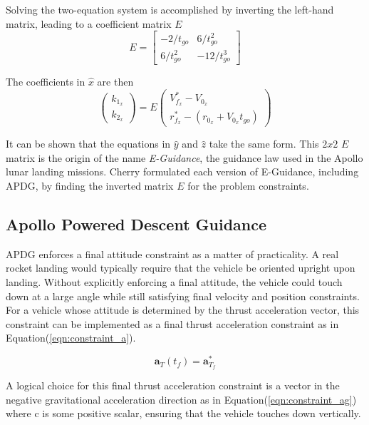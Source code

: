 Solving the two-equation system is accomplished by inverting the left-hand matrix, leading to a coefficient matrix $E$
\begin{equation}
E = 
	\begin{bmatrix}
	-2/t_{go} & 6/t_{go}^2 \\
	6/t_{go}^2 & -12/t_{go}^3
	\end{bmatrix}
\end{equation}

The coefficients in $\hat{x}$ are then
\begin{equation}
\label{eqn:simplelaw}
\begin{pmatrix}
k_{1_x} \\
k_{2_x}
\end{pmatrix}
= E
\begin{pmatrix}
V_{f_x}^* - V_{0_x} \\ 
r_{f_x}^* - (r_{0_x} + V_{0_x}t_{go}) 
\end{pmatrix}
\end{equation}

It can be shown that the equations in $\hat{y}$ and $\hat{z}$ take the same form. This $2x2$ $E$ matrix is the origin of the name \textit{E-Guidance}, the guidance law used in the Apollo lunar landing missions. Cherry formulated each version of E-Guidance, including APDG, by finding the inverted matrix $E$ for the problem constraints.

\subsection{Apollo Powered Descent Guidance} \label{sec:APDG}

APDG enforces a final attitude constraint as a matter of practicality. A real rocket landing would typically require that the vehicle be oriented upright upon landing. Without explicitly enforcing a final attitude, the vehicle could touch down at a large angle while still satisfying final velocity and position constraints. For a vehicle whose attitude is determined by the thrust acceleration vector, this constraint can be implemented as a final thrust acceleration constraint as in Equation\:(\ref{eqn:constraint_a}).

\begin{equation}
\label{eqn:constraint_a}
\bm{a}_T(t_f) = \bm{a}^*_{T_f}
\end{equation}

A logical choice for this final thrust acceleration constraint is a vector in the negative gravitational acceleration direction as in Equation\:(\ref{eqn:constraint_ag}) where c is some positive scalar, ensuring that the vehicle touches down vertically. 

